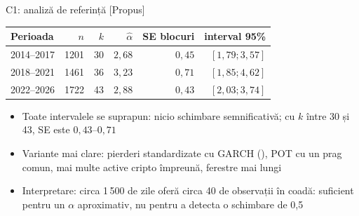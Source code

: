\ifsolutions
\begin{frame}{C1: analiză de referință [Propus]}
\itemsize{\footnotesize}
\begin{center}
\footnotesize
\begin{tabular}{lrrrrr}
\toprule
Perioada & $n$ & $k$ & $\hat\alpha$ & SE blocuri & interval 95\% \\
\midrule
2014--2017 & 1201 & 30 & $2{,}68$ & $0{,}45$ & $[1{,}79; 3{,}57]$ \\
2018--2021 & 1461 & 36 & $3{,}23$ & $0{,}71$ & $[1{,}85; 4{,}62]$ \\
2022--2026 & 1722 & 43 & $2{,}88$ & $0{,}43$ & $[2{,}03; 3{,}74]$ \\
\bottomrule
\end{tabular}
\end{center}
\begin{itemize}
    \item Toate intervalele se suprapun: nicio schimbare semnificativă; cu $k$ între 30 și 43, SE este $0{,}43$--$0{,}71$
    \item Variante mai clare: pierderi standardizate cu GARCH (), POT cu un prag comun, mai multe active cripto împreună, ferestre mai lungi
    \item Interpretare: circa 1\,500 de zile oferă circa 40 de observații în coadă: suficient pentru un $\alpha$ aproximativ, nu pentru a detecta o schimbare de 0,5
\end{itemize}
\end{frame}
\fi

